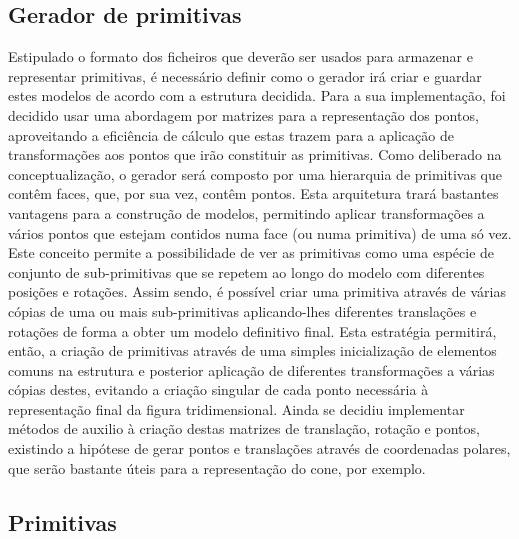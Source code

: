 \subsection{Gerador de primitivas}

Estipulado o formato dos ficheiros que deverão ser usados para armazenar
e representar primitivas, é necessário definir como o gerador irá criar e
guardar estes modelos de acordo com a estrutura decidida.\newline
\break
\noindent
Para a sua implementação, foi decidido usar uma abordagem por matrizes
para a representação dos pontos, aproveitando a eficiência de cálculo
que estas trazem para a aplicação de transformações aos pontos que irão
constituir as primitivas.\newline
\break
\noindent
Como deliberado na conceptualização, o gerador será composto por uma
hierarquia de primitivas que contêm faces, que, por sua vez, contêm
pontos. Esta arquitetura trará bastantes vantagens para a construção
de modelos, permitindo aplicar transformações a vários pontos que estejam
contidos numa face (ou numa primitiva) de uma só vez.\newline
\break
\noindent
Este conceito permite a possibilidade de ver as primitivas como uma
espécie de conjunto de sub-primitivas que se repetem ao longo do modelo
com diferentes posições e rotações.\newline
\break
\noindent
Assim sendo, é possível criar uma primitiva através de várias cópias
de uma ou mais sub-primitivas aplicando-lhes diferentes translações
e rotações de forma a obter um modelo definitivo final.\newline
\break
\noindent
Esta estratégia permitirá, então, a criação de primitivas através de
uma simples inicialização de elementos comuns na estrutura e posterior
aplicação de diferentes transformações a várias cópias destes, evitando
a criação singular de cada ponto necessária à representação final
da figura tridimensional.\newline
\break
\noindent
Ainda se decidiu implementar métodos de auxilio à criação destas
matrizes de translação, rotação e pontos, existindo a hipótese de
gerar pontos e translações através de coordenadas polares, que serão
bastante úteis para a representação do cone, por exemplo.

\subsection{Primitivas}

